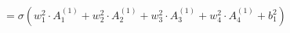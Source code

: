 \documentclass[preview]{standalone}
\begin{document}
\begin{align*}
=\sigma \left(w_{1}^{2} \cdot A_{1}^{(1)}+w_{2}^{2} \cdot A_{2}^{(1)}+w_{3}^{2} \cdot A_{3}^{(1)}+w_{4}^{2} \cdot A_{4}^{(1)}+b_{1}^{2}\right)
\end{align*}
\end{document}
